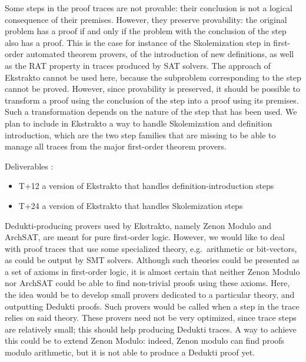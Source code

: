 \begin{workpackage}[id=atpetc,wphases=0-48,type=RTD,
  short=ATPs etc.,%
  title={ATP, SAT, SMT, Model checkers},
  lead=Lie,
  LieRM=10]
\begin{tasklist}
\begin{task}[id=tracetodedukti, title=Translate ATP traces into Dedukti]
\begin{compactenum}

\item  Some steps in the proof traces are not provable: their conclusion is
  not a logical consequence of their premises. However, they preserve
  provability: the original problem has a proof if and only if the
  problem with the conclusion of the step also has a proof. This is the
  case for instance of the Skolemization step in first-order automated
  theorem provers, of the introduction of new definitions, as well as
  the RAT property in traces produced by SAT solvers. The approach of
  Ekstrakto cannot be used here, because the subproblem corresponding to
  the step cannot be proved. However, since provability is preserved, it
  should be possible to transform a
  proof using the conclusion of the step into a proof using its
  premises. Such a transformation depends on the nature of the step that
  has been used. We plan to include in Ekstrakto a way to handle
  Skolemization and definition introduction, which are the two step
  families that are missing to be able to manage all traces from the
  major first-order theorem provers.

  Deliverables :
  \begin{itemize}
  \item T+12 a version of Ekstrakto that handles definition-introduction steps
  \item T+24 a version of Ekstrakto that handles Skolemization steps
  \end{itemize}



\item  Dedukti-producing provers used by Ekstrakto, namely Zenon Modulo and
  ArchSAT, are meant for pure first-order logic. However, we would like
  to deal with proof traces that use some specialized theory,
  e.g.\ arithmetic or bit-vectors, as could be output by SMT
  solvers. Although such theories could be presented as a set of axioms
  in first-order logic, it is almost certain that neither Zenon Modulo
  nor ArchSAT could be able to find non-trivial proofs using these
  axioms. Here, the idea would be to develop small provers dedicated to
  a particular theory, and outputting Dedukti proofs. Such provers would
  be called when a step in the trace relies on said theory. These
  provers need not be very optimized, since trace steps are relatively
  small; this should help producing Dedukti traces. A way to achieve
  this could be to extend Zenon Modulo: indeed, Zenon modulo can find
  proofs modulo arithmetic, but it is not able to produce a Dedukti
  proof yet.


\end{compactenum}
\end{task}
\end{tasklist}
\end{workpackage}
